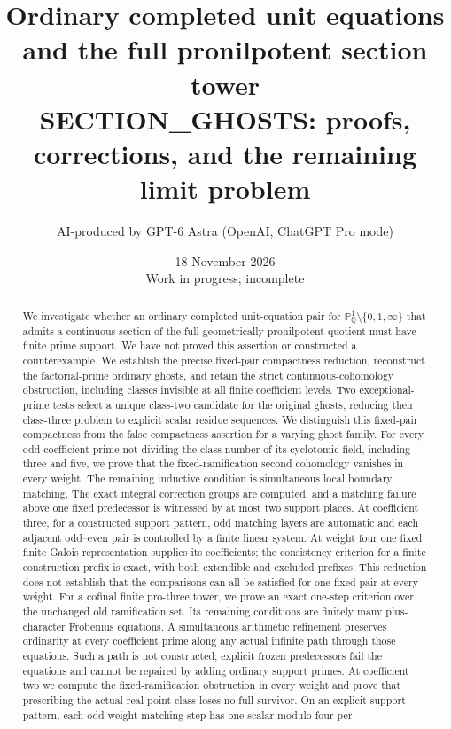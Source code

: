 \documentclass[11pt,a4paper]{article}
\title{Ordinary completed unit equations and the full pronilpotent section tower\\[5pt]
\large SECTION\_GHOSTS: proofs, corrections, and the remaining limit problem}
\author{AI-produced by GPT-6 Astra (OpenAI, ChatGPT Pro mode)}
\date{18 November 2026\\\small Work in progress; incomplete}
\begin{document}
\maketitle
\begin{abstract}
We investigate whether an ordinary completed unit-equation pair for
\(\mathbb P^1_{\mathbb Q}\setminus\{0,1,\infty\}\) that admits a continuous
section of the full geometrically pronilpotent quotient must have finite
prime support. We have not proved this assertion or constructed a
counterexample. We establish the precise fixed-pair compactness reduction,
reconstruct the factorial-prime ordinary ghosts, and retain the strict
continuous-cohomology obstruction, including classes invisible at all
finite coefficient levels. Two exceptional-prime tests select a unique
class-two candidate for the original ghosts, reducing their class-three
problem to explicit scalar residue sequences. We distinguish this fixed-pair
compactness from the false compactness assertion for a varying ghost family.
For every odd coefficient prime not dividing the class number of its
cyclotomic field, including three and five, we prove that the
fixed-ramification second cohomology vanishes in every weight.
The remaining inductive condition is simultaneous local boundary matching.
The exact integral correction groups are computed, and a matching failure
above one fixed predecessor is witnessed by at most two support places.
At coefficient three, for a constructed support pattern,
odd matching layers are automatic and each adjacent odd--even pair is
controlled by a finite linear system. At weight four one fixed finite
Galois representation supplies its coefficients; the consistency criterion
for a finite construction prefix is exact, with both extendible and
excluded prefixes. This reduction does not establish that the comparisons
can all be satisfied for one fixed pair at every weight.
For a cofinal finite pro-three tower, we prove an exact one-step
criterion over the unchanged old ramification set. Its remaining
conditions are finitely many plus-character Frobenius equations.
A simultaneous arithmetic refinement preserves ordinarity at every
coefficient prime along any actual infinite path through those
equations. Such a path is not constructed; explicit frozen
predecessors fail the equations and cannot be repaired by adding
ordinary support primes.
At coefficient two we compute the fixed-ramification obstruction
in every weight and prove that prescribing the actual real point
class loses no full survivor. On an explicit support pattern,
each odd-weight matching step has one scalar modulo four per

\end{abstract}
\end{document}
